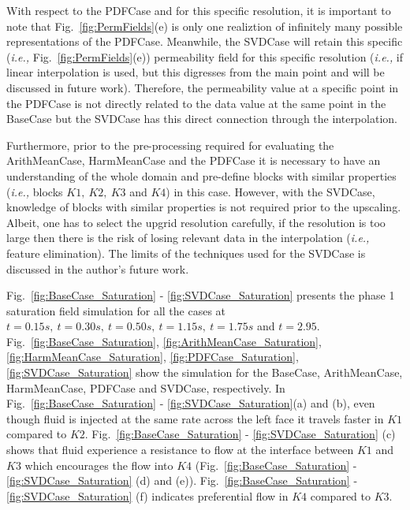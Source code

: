 \documentclass[preprint,12pt]{elsarticle}
\newcommand{\ie}{{\it i.e., }}
\begin{document}
With respect to the PDFCase and for this specific resolution, it is important to note that Fig.~\ref{fig:PermFields}(e) is only one realiztion of infinitely many possible representations of the PDFCase. Meanwhile, the SVDCase will retain this specific (\ie Fig.~\ref{fig:PermFields}(e)) permeability field for this specific resolution (\ie if linear interpolation is used, but this digresses from the main point and will be discussed in future work). Therefore, the permeability value at a specific point in the PDFCase is not directly related to the data value at the same point in the BaseCase but the SVDCase has this direct connection through the interpolation.

Furthermore, prior to the pre-processing required for evaluating the ArithMeanCase, HarmMeanCase and the PDFCase it is necessary to have an understanding of the whole domain and pre-define blocks with similar properties (\ie blocks $K1,~K2,~K3$ and $K4$) in this case. However, with the SVDCase, knowledge of blocks with similar properties is not required prior to the upscaling. Albeit, one has to select the upgrid resolution carefully, if the resolution is too large then there is the risk of losing relevant data in the interpolation (\ie feature elimination). The limits of the techniques used for the SVDCase is discussed in the author's future work.

Fig.~\ref{fig:BaseCase_Saturation} - \ref{fig:SVDCase_Saturation} presents the phase 1 saturation field simulation for all the cases at $t=0.15s,~t=0.30s,~t=0.50s,~t=1.15s,~t=1.75s$ and $t=2.95$. Fig.~\ref{fig:BaseCase_Saturation}, \ref{fig:ArithMeanCase_Saturation}, \ref{fig:HarmMeanCase_Saturation}, \ref{fig:PDFCase_Saturation}, \ref{fig:SVDCase_Saturation} show the simulation for the BaseCase, ArithMeanCase, HarmMeanCase, PDFCase and SVDCase, respectively. In Fig.~\ref{fig:BaseCase_Saturation} - \ref{fig:SVDCase_Saturation}(a) and (b), even though fluid is injected at the same rate across the left face it travels faster in $K1$ compared to $K2$. Fig.~\ref{fig:BaseCase_Saturation} - \ref{fig:SVDCase_Saturation}  (c) shows that fluid experience a resistance to flow at the interface between $K1$ and $K3$ which encourages the flow into $K4$ (Fig.~\ref{fig:BaseCase_Saturation} - \ref{fig:SVDCase_Saturation} (d) and (e)). Fig.~\ref{fig:BaseCase_Saturation} - \ref{fig:SVDCase_Saturation} (f) indicates preferential flow in $K4$ compared to $K3$.
\end{document}
